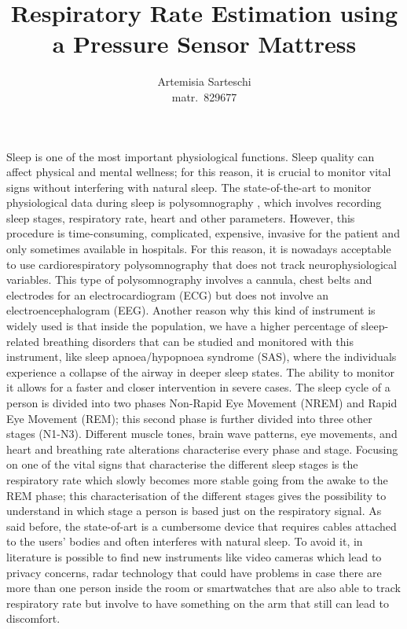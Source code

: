 \documentclass[a4paper,11pt, oneside,italian]{article}
\title{Respiratory Rate Estimation using a Pressure Sensor Mattress}
\author{Artemisia Sarteschi\\\smaller matr.~829677}
\date{}
\begin{document}
\maketitle
{}
\noindent


Sleep is one of the most important physiological functions. Sleep quality can affect physical 
and mental wellness; for this reason,
it is crucial to monitor vital signs without interfering with natural sleep. 
The state-of-the-art to monitor physiological data during sleep is polysomnography%
, which involves recording sleep stages, respiratory rate, heart and other parameters. However, this procedure is time-consuming, 
complicated, expensive, invasive for the patient and only sometimes available in hospitals. For this reason, it is nowadays 
acceptable to use cardiorespiratory polysomnography that does not track neurophysiological variables. This type of polysomnography
involves a cannula, chest belts and electrodes for an electrocardiogram (ECG) but does not involve an electroencephalogram (EEG).
Another reason why this kind of instrument is widely used is that inside the population, we have a higher percentage of 
sleep-related breathing disorders that can be studied and monitored with this instrument, like sleep apnoea/hypopnoea syndrome (SAS), 
where the individuals experience a collapse 
of the airway in deeper sleep states. The ability to monitor it allows for a faster and closer intervention in severe cases. 
The sleep cycle of a person is divided into two phases Non-Rapid Eye Movement (NREM) and Rapid Eye Movement (REM);
this second phase is further divided into three other stages (N1-N3). Different muscle tones, brain wave patterns, 
eye movements, and heart and breathing rate alterations characterise every phase and stage.
Focusing on one of the vital signs that characterise the different sleep stages is the respiratory rate 
which slowly becomes more stable going from the awake to the REM phase; this characterisation of the different stages gives the possibility to 
understand in which stage a person is based just on the respiratory signal.
As said before, the state-of-art is a cumbersome device that requires cables attached to the users' bodies and often interferes with natural sleep. To avoid it, in literature is possible to find new instruments like video cameras which lead to privacy concerns, radar technology that could have problems in case there are more than one person inside the room or smartwatches that are also able to track respiratory rate but involve to have something on the arm that still can lead to discomfort.
\end{document}
